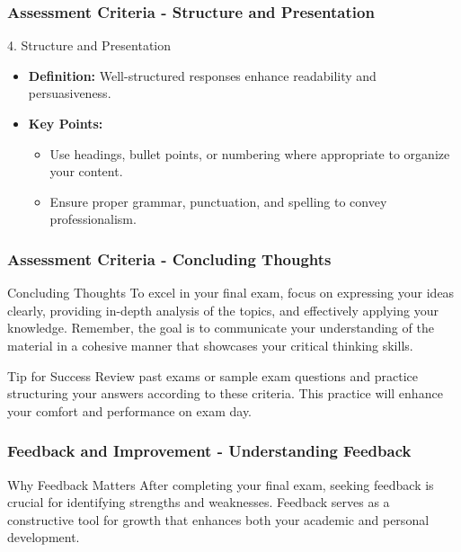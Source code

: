 \documentclass[aspectratio=169]{beamer}
\begin{document}
\begin{frame}[fragile]
    \frametitle{Assessment Criteria - Structure and Presentation}
    \begin{block}{4. Structure and Presentation}
        \begin{itemize}
            \item \textbf{Definition:} Well-structured responses enhance readability and persuasiveness.
            \item \textbf{Key Points:}
                \begin{itemize}
                    \item Use headings, bullet points, or numbering where appropriate to organize your content.
                    \item Ensure proper grammar, punctuation, and spelling to convey professionalism.
                \end{itemize}
        \end{itemize}
    \end{block}
\end{frame}

\begin{frame}[fragile]
    \frametitle{Assessment Criteria - Concluding Thoughts}
    \begin{block}{Concluding Thoughts}
        To excel in your final exam, focus on expressing your ideas clearly, providing in-depth analysis of the topics, 
        and effectively applying your knowledge. Remember, the goal is to communicate your understanding of the material 
        in a cohesive manner that showcases your critical thinking skills.
    \end{block}

    \begin{block}{Tip for Success}
        Review past exams or sample exam questions and practice structuring your answers according to these criteria. 
        This practice will enhance your comfort and performance on exam day.
    \end{block}
\end{frame}

\begin{frame}[fragile]
    \frametitle{Feedback and Improvement - Understanding Feedback}
    \begin{block}{Why Feedback Matters}
        After completing your final exam, seeking feedback is crucial for identifying strengths and weaknesses. 
        Feedback serves as a constructive tool for growth that enhances both your academic and personal development.
    \end{block}
\end{frame}
\end{document}

